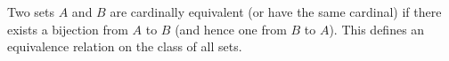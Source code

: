 Two sets $A$ and $B$ are cardinally equivalent (or have the same cardinal) if there exists a bijection from $A$ to $B$ (and hence one from $B$ to $A$). This defines an equivalence relation on the class of all sets.
